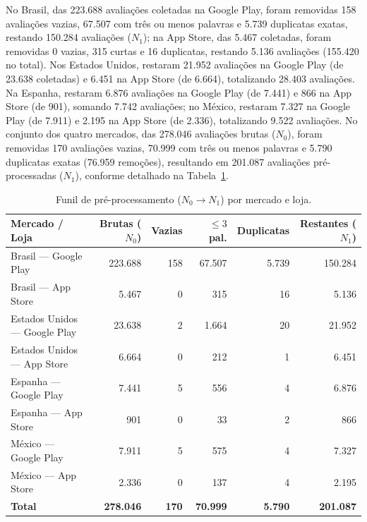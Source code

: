 No Brasil, das 223.688 avaliações coletadas na Google Play, foram removidas 158 avaliações vazias, 67.507 com três ou menos palavras e 5.739 duplicatas exatas, restando 150.284 avaliações ($N_1$); na App Store, das 5.467 coletadas, foram removidas 0 vazias, 315 curtas e 16 duplicatas, restando 5.136 avaliações (155.420 no total). Nos Estados Unidos, restaram 21.952 avaliações na Google Play (de 23.638 coletadas) e 6.451 na App Store (de 6.664), totalizando 28.403 avaliações. Na Espanha, restaram 6.876 avaliações na Google Play (de 7.441) e 866 na App Store (de 901), somando 7.742 avaliações; no México, restaram 7.327 na Google Play (de 7.911) e 2.195 na App Store (de 2.336), totalizando 9.522 avaliações. No conjunto dos quatro mercados, das 278.046 avaliações brutas ($N_0$), foram removidas 170 avaliações vazias, 70.999 com três ou menos palavras e 5.790 duplicatas exatas (76.959 remoções), resultando em 201.087 avaliações pré-processadas ($N_1$), conforme detalhado na Tabela~\ref{tab:preprocessamento}.

\begin{table}[htbp]
\centering
\caption{Funil de pré-processamento ($N_0 \to N_1$) por mercado e loja.}
\label{tab:preprocessamento}
\small
\begin{tabular}{lrrrrr}
\toprule
\textbf{Mercado / Loja} & \textbf{Brutas ($N_0$)} & \textbf{Vazias} & \textbf{$\le 3$ pal.} & \textbf{Duplicatas} & \textbf{Restantes ($N_1$)} \\
\midrule
Brasil --- Google Play         & 223.688 & 158 & 67.507 & 5.739 & 150.284 \\
Brasil --- App Store           &   5.467 &   0 &    315 &    16 &   5.136 \\
Estados Unidos --- Google Play &  23.638 &   2 &  1.664 &    20 &  21.952 \\
Estados Unidos --- App Store   &   6.664 &   0 &    212 &     1 &   6.451 \\
Espanha --- Google Play        &   7.441 &   5 &    556 &     4 &   6.876 \\
Espanha --- App Store          &     901 &   0 &     33 &     2 &     866 \\
México --- Google Play         &   7.911 &   5 &    575 &     4 &   7.327 \\
México --- App Store           &   2.336 &   0 &    137 &     4 &   2.195 \\
\midrule
\textbf{Total}                 & \textbf{278.046} & \textbf{170} & \textbf{70.999} & \textbf{5.790} & \textbf{201.087} \\
\bottomrule
\end{tabular}
\end{table}

